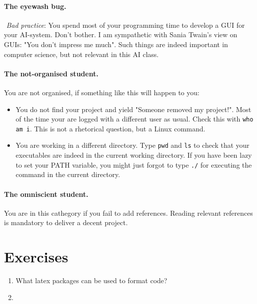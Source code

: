 \documentclass[a4paper,12pt]{report}
\begin{document}
\paragraph{The eyewash bug.} $ $
{\it Bad practice}: You spend most of your programming time to develop a GUI for your AI-system. 
Don't bother. I am sympathetic with Sania Twain's view on GUIs: "You don't impress me much".
Such things are indeed important in computer science, but not relevant in this AI class.



\paragraph{The not-organised student.}
You are not organised, if something like this will happen to you:
\begin{itemize}
 \item You do not find your project and yield "Someone removed my project!". 
Most of the time your are logged with a different user as usual. 
Check this with \texttt{who am i}. 
This is not a rhetorical question, but a Linux command.
\item You are working in a different directory. 
Type \texttt{pwd} and \texttt{ls} to check that your executables are indeed in the current working directory.
If you have been lazy to set your PATH variable, you might just forgot to type \texttt{./} 
for executing the command in the current directory.
\end{itemize}

\paragraph{The omniscient student.}
You are in this cathegory if you fail to add references. 
Reading relevant references is mandatory to deliver a decent project. 

\section{Exercises}
\begin{enumerate}
 \item What latex packages can be used to format code? 
 \item 
\end{enumerate}
\end{document}
